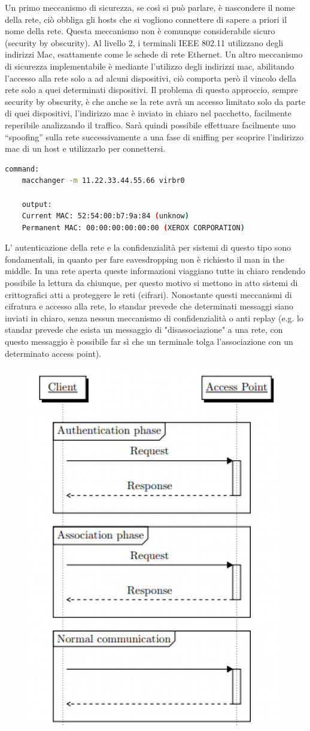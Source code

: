 Un primo meccanismo di sicurezza, se così si può parlare, è nascondere il nome della rete, ciò obbliga gli hosts che si vogliono connettere di sapere a priori il nome della rete. Questa meccanismo non è comunque considerabile sicuro (security by obscurity).
Al livello 2, i terminali IEEE 802.11 utilizzano degli indirizzi Mac, esattamente come le
schede di rete Ethernet.
Un altro meccanismo di sicurezza implementabile è mediante l'utilizzo degli indirizzi mac, abilitando l'accesso alla rete solo a ad alcuni dispositivi, ciò comporta però il vincolo della rete solo a quei determinati dispositivi. Il problema di questo approccio, sempre security by obscurity, è che anche se la rete avrà un accesso limitato solo da parte di quei dispositivi, l'indirizzo mac è inviato in chiaro nel pacchetto, facilmente reperibile analizzando il traffico. Sarà quindi possibile effettuare facilmente uno “spoofing” sulla rete successivamente a una fase di sniffing per scoprire l'indirizzo mac di un host e utilizzarlo per connettersi.

\begin{lstlisting}[language=bash]
    command:
    macchanger -m 11.22.33.44.55.66 virbr0

    output: 
    Current MAC: 52:54:00:b7:9a:84 (unknow)
    Permanent MAC: 00:00:00:00:00:00 (XEROX CORPORATION)
\end{lstlisting}

L' autenticazione della rete e la confidenzialità per sistemi di questo tipo sono fondamentali, in quanto per fare eavesdropping non è richiesto il man in the middle.
In una rete aperta queste informazioni viaggiano tutte in chiaro rendendo possibile la lettura da chiunque, per questo motivo si mettono in atto sistemi di crittografici atti a proteggere le reti (cifrari).
Nonostante questi meccanismi di cifratura e accesso alla rete, lo standar prevede che determinati messaggi siano inviati in chiaro, senza nessun meccanismo di confidenzialità o anti replay (e.g. lo standar prevede che esista un messaggio di "disassociazione" a una rete, con questo messaggio
è possibile far sì che un terminale tolga l’associazione con un determinato access point).

\begin{figure}[h!]
    \centering
    \includegraphics[width=.4\linewidth]{res/IEEE80211.png}
    \caption{}
\end{figure}

